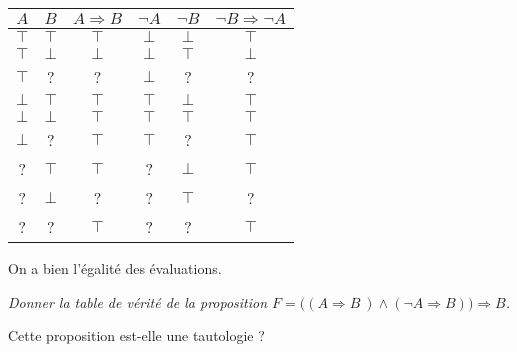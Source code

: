 \begin{Answer}
\begin{center}
\begin{tabular}{|c|c|c|c|c|c|}
\hline
$A$ & $B$ & $A\Rightarrow B$ & $\neg A$ & $\neg B$ & $\neg B\Rightarrow  \neg A$\\ 
\hline
$\top $ & $\top $ & $\top $ & $\bot $ & $\bot $ & $\top $ \\ 
$\top $ & $\bot $ & $\bot $ & $\bot $ & $\top $ & $\bot $  \\ 
$\top $ &    ?    &    ?    & $\bot $ &    ?    &    ?    \\ 
$\bot $ & $\top $ & $\top $ & $\top $ & $\bot $ & $\top $ \\ 
$\bot $ & $\bot $ & $\top $ & $\top $ & $\top $ & $\top $ \\ 
$\bot $ &    ?    & $\top $ & $\top $ &    ?    & $\top $ \\ 
   ?    & $\top $ & $\top $ &    ?    & $\bot $ & $\top $ \\ 
   ?    & $\bot $ &    ?    &    ?    & $\top $ &    ?    \\ 
   ?    &    ?    & $\top $ &    ?    &    ?    & $\top $ \\ 
\hline
\end{tabular}%
\end{center}
On a bien l'égalité des évaluations.
\end{Answer}
\begin{Exercise}\it
Donner la table de vérité de la proposition $F = \bigl( ( A\Rightarrow B\ ) \wedge  (  \neg A\Rightarrow B) \bigr) \Rightarrow B$. 

Cette proposition est-elle une tautologie ?
\end{Exercise}

